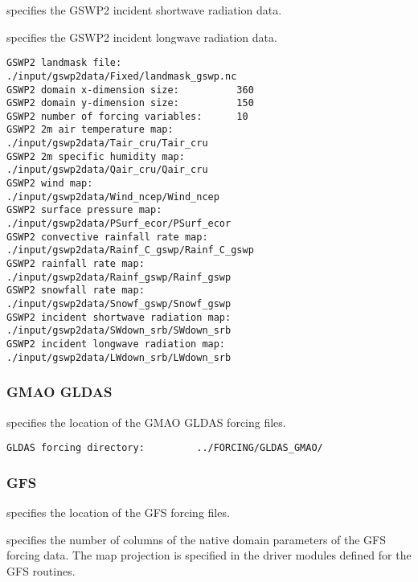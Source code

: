  specifies the GSWP2
 incident shortwave radiation data.

  specifies the GSWP2
 incident longwave radiation data.
 

 \begin{Verbatim}[frame=single]
GSWP2 landmask file:                    ./input/gswp2data/Fixed/landmask_gswp.nc
GSWP2 domain x-dimension size:          360
GSWP2 domain y-dimension size:          150
GSWP2 number of forcing variables:      10
GSWP2 2m air temperature map:           ./input/gswp2data/Tair_cru/Tair_cru
GSWP2 2m specific humidity map:         ./input/gswp2data/Qair_cru/Qair_cru
GSWP2 wind map:                         ./input/gswp2data/Wind_ncep/Wind_ncep
GSWP2 surface pressure map:             ./input/gswp2data/PSurf_ecor/PSurf_ecor
GSWP2 convective rainfall rate map:     ./input/gswp2data/Rainf_C_gswp/Rainf_C_gswp
GSWP2 rainfall rate map:                ./input/gswp2data/Rainf_gswp/Rainf_gswp
GSWP2 snowfall rate map:                ./input/gswp2data/Snowf_gswp/Snowf_gswp
GSWP2 incident shortwave radiation map: ./input/gswp2data/SWdown_srb/SWdown_srb
GSWP2 incident longwave radiation map:  ./input/gswp2data/LWdown_srb/LWdown_srb
 \end{Verbatim}

 
 \subsubsection{GMAO GLDAS} \label{sssec:forcings_gmaogldas}
 

 
  specifies the location of the
 GMAO GLDAS forcing files.
 

 \begin{Verbatim}[frame=single]
GLDAS forcing directory:         ../FORCING/GLDAS_GMAO/
 \end{Verbatim}

 
 \subsubsection{GFS} \label{sssec:forcings_gfs}
  specifies the location of the GFS
 forcing files.

  specifies the number of
 columns of the native domain parameters of the GFS forcing data.
 The map projection is specified in the driver modules defined for
 the GFS routines.

